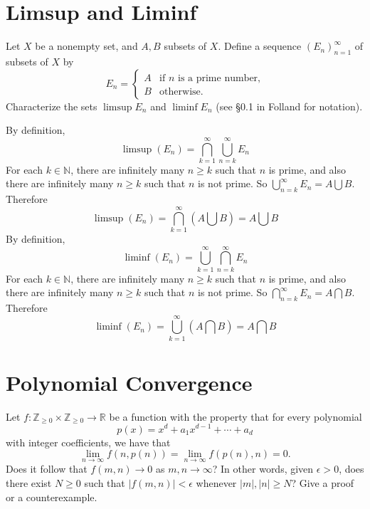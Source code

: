 \documentclass[lang=cn,11pt]{elegantbook}
\begin{document}
\section{Limsup and Liminf}
Let $X$ be a nonempty set, and $A, B$ subsets of $X$. Define a sequence $(E_n)_{n=1}^\infty$ of subsets of $X$ by
\[
E_n = 
\begin{cases} 
A & \text{if } n \text{ is a prime number,} \\
B & \text{otherwise.}
\end{cases}
\]
Characterize the sets $\limsup E_n$ and $\liminf E_n$ (see §0.1 in Folland for notation).
\begin{solution}
By definition, 
    $$
    \limsup (E_n)  = \bigcap_{k = 1}^\infty \bigcup_{n=k}^\infty E_n
    $$
For each $k \in \mathbb{N}$, there are infinitely many $n \geq k$ such that $n$ is prime, and also there are infinitely many $n \geq k$ such that $n$ is not prime. So $ \bigcup_{n=k}^\infty E_n = A \bigcup B$.
Therefore
$$
\limsup (E_n)  = \bigcap_{k = 1}^\infty (A\bigcup B) = A\bigcup B
$$
By definition, 
    $$
    \liminf (E_n)  = \bigcup_{k = 1}^\infty \bigcap_{n=k}^\infty E_n
    $$
For each $k \in \mathbb{N}$, there are infinitely many $n \geq k$ such that $n$ is prime, and also there are infinitely many $n \geq k$ such that $n$ is not prime. So $ \bigcap_{n=k}^\infty E_n = A \bigcap B$.
Therefore
$$
\liminf (E_n)  = \bigcup_{k = 1}^\infty (A\bigcap B) = A\bigcap B
$$

\end{solution}




\section{Polynomial Convergence}
Let $f : \mathbb{Z}_{\geq 0} \times \mathbb{Z}_{\geq 0} \to \mathbb{R}$ be a function with the property that for every polynomial
\[
p(x) = x^d + a_1 x^{d-1} + \cdots + a_d
\]
with integer coefficients, we have that
\[
\lim_{n \to \infty} f(n, p(n)) = \lim_{n \to \infty} f(p(n), n) = 0.
\]
Does it follow that $f(m,n) \to 0$ as $m, n \to \infty$? In other words, given $\epsilon > 0$, does there exist $N \geq 0$ such that $\lvert f(m,n) \rvert < \epsilon$ whenever $\lvert m \rvert, \lvert n \rvert \geq N$? Give a proof or a counterexample.
\end{document}
